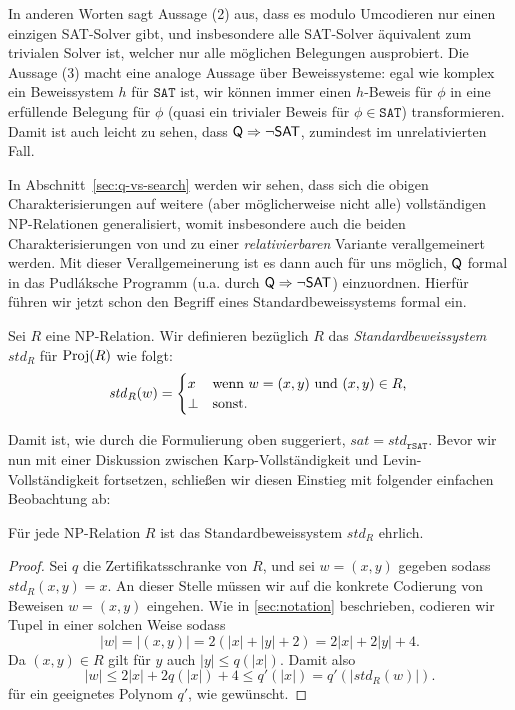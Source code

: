 In anderen Worten sagt Aussage (2) aus, dass es modulo Umcodieren nur einen einzigen SAT-Solver gibt, und insbesondere alle SAT-Solver äquivalent zum trivialen Solver ist, welcher nur alle möglichen Belegungen ausprobiert.
Die Aussage (3) macht eine analoge Aussage über Beweissysteme: egal wie komplex ein Beweissystem $h$ für $\mathtt{SAT}$ ist, wir können immer einen $h$-Beweis für $\phi$ in eine erfüllende Belegung für $\phi$ (quasi ein trivialer Beweis für $\phi\in\mathtt{SAT}$) transformieren. Damit ist auch leicht zu sehen, dass $\mathsf{Q}\Rightarrow \neg\mathsf{SAT}$, zumindest im unrelativierten Fall.

In Abschnitt~\ref{sec:q-vs-search} werden wir sehen, dass sich die obigen Charakterisierungen auf weitere (aber möglicherweise nicht alle) vollständigen NP-Relationen generalisiert, womit insbesondere auch die beiden Charakterisierungen von \citeauthor{fenner_inverting_2003} und \citeauthor{messner_simulation_2001} zu einer \emph{relativierbaren} Variante verallgemeinert werden.
Mit dieser Verallgemeinerung ist es dann auch für uns möglich, $\mathsf{Q}$ formal in das Pudláksche Programm (u.a. durch $\mathsf{Q}\Rightarrow \neg\mathsf{SAT}$) einzuordnen. Hierfür führen wir jetzt schon den Begriff eines Standardbeweissystems formal ein.

\begin{definition}[Standardbeweissystem]
    Sei $R$ eine NP-Relation. Wir definieren bezüglich $R$ das \emph{Standardbeweissystem} $\mathit{std}_R$ für $\operatorname{Proj}(R)$ wie folgt:
    \[ \mathit{std}_R(w) = \begin{cases} x & \text{wenn $w=(x,y)$ und $(x,y)\in R$,}\\
    \bot & \text{sonst}.\end{cases} \qedhere \] 
\end{definition}
Damit ist, wie durch die Formulierung oben suggeriert, $\mathit{sat}=\mathit{std}_{\mathtt{rSAT}}$.
Bevor wir nun mit einer Diskussion zwischen Karp-Vollständigkeit und Levin-Vollständigkeit fortsetzen, schließen wir diesen Einstieg mit folgender einfachen Beobachtung ab:
\begin{observation}\label{obs:spps-honest}
    Für jede NP-Relation $R$ ist das Standardbeweissystem $\mathit{std}_R$ ehrlich.
\end{observation}
\begin{proof}
    Sei $q$ die Zertifikatsschranke von $R$, und sei $w=(x,y)$ gegeben sodass $\mathit{std}_R(x,y) = x$.
    An dieser Stelle müssen wir auf die konkrete Codierung von Beweisen $w=(x,y)$ eingehen.
    Wie in \ref{sec:notation} beschrieben, codieren wir Tupel in einer solchen Weise sodass
    \[ |w| = |(x,y)| = 2(|x|+|y|+2) = 2|x|+ 2|y| + 4. \]
    Da $(x,y)\in R$ gilt für $y$ auch $|y|\leq q(|x|)$.
    Damit also
    \[ |w| \leq 2|x|+ 2q(|x|) + 4 \leq q'(|x|) = q'(|\mathit{std}_R(w)|). \]
    für ein geeignetes Polynom $q'$, wie gewünscht.
\end{proof}

